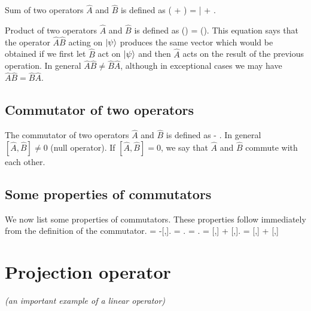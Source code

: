\vspace{3mm}
Sum of two operators $\hat{A}$ and $\hat{B}$ is defined as
\be
( + )\ket{\psi} = |\ket{\psi} +  \ket{\psi}.
\ee

\vspace{3mm}
Product of two operators $\hat{A}$ and $\hat{B}$ is defined as
\be
()\ket{\psi} = (\ket{\psi}).
\ee
This equation says that the operator $\hat{A}\hat{B}$ acting on $\ket{\psi}$ produces the same vector which would be obtained if we first let $\hat{B}$ 
act on $\ket{\psi}$ and then $\hat{A}$ acts on the result of the previous operation. In general 
$\hat{A}\hat{B} \neq \hat{B}\hat{A}$, although in exceptional cases we may have $\hat{A}\hat{B} = \hat{B}\hat{A}$.



\subsection{Commutator of two operators}

The commutator of two operators $\hat{A}$ and $\hat{B}$ is defined as
   - .
\ee
In general $[\hat{A},\hat{B}] \neq 0$ (null operator). If $[\hat{A},\hat{B}] = 0$, we say that $\hat{A}$ and $\hat{B}$ commute with each other.


\subsection{Some properties of commutators}
We now list some properties of commutators. These properties follow immediately from the definition of the commutator.
 = -[,]. 
\ee
{} = . 
\ee
{} = . 
\ee
{} = [,] + [,].
\ee
{} = [,] + [,] 
\ee








\section{Projection operator}
\textit{(an important example of a linear operator)}

